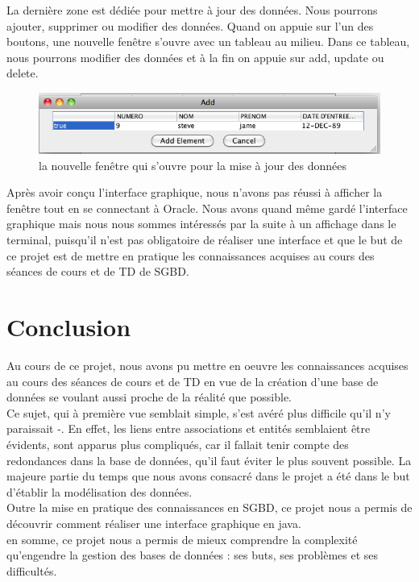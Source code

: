\documentclass{article}
\begin{document}
La dernière zone est dédiée pour mettre à jour des données. Nous pourrons ajouter, supprimer ou modifier des données. Quand on appuie sur l'un des boutons, une nouvelle fenêtre s'ouvre avec un tableau au milieu. Dans ce tableau, nous pourrons modifier des données et à la fin on appuie sur add, update ou delete. \\


\begin{figure}[!h]
\centering
\includegraphics[scale = 0.4] {4.png}
\caption{la nouvelle fenêtre qui s'ouvre pour la mise à jour des données}
\end{figure}


Après avoir conçu l'interface graphique, nous n'avons pas réussi à afficher la fenêtre tout en se connectant à Oracle. Nous avons quand même gardé l'interface graphique mais nous nous sommes intéressés par la suite à un affichage dans le terminal, puisqu'il n'est pas obligatoire de réaliser une interface et que le but de ce projet est de mettre en pratique les connaissances acquises au cours des séances de cours et de TD de SGBD. 

\newpage
\section*{Conclusion}
Au cours de ce projet, nous avons pu mettre en oeuvre les connaissances acquises au cours des séances de cours et de TD en vue de la création d'une base de données se voulant aussi proche de la réalité que possible. \\

Ce sujet, qui à première vue semblait simple, s'est avéré plus difficile qu'il n'y paraissait -. En effet, les liens entre associations et entités semblaient être évidents, sont apparus plus compliqués, car il fallait tenir compte des redondances dans la base de données, qu'il faut éviter le plus souvent possible. La majeure partie du temps que nous avons consacré dans le projet a été dans le but d'établir la modélisation des données.  \\

Outre la mise en pratique des connaissances en SGBD, ce projet nous a permis de découvrir comment réaliser une interface graphique en java. \\

en somme, ce projet nous a permis de mieux comprendre la complexité qu'engendre la gestion des bases de données : ses buts, ses problèmes et ses difficultés. 
\end{document}
